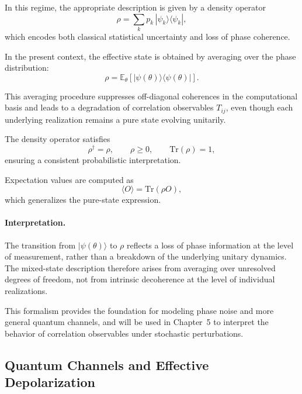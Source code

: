 \documentclass[a4paper]{article}
\begin{document}
\medskip

In this regime, the appropriate description is given by a density operator
\[
\rho = \sum_k p_k \, |\psi_k\rangle \langle \psi_k|,
\]
which encodes both classical statistical uncertainty and loss of phase coherence.

\medskip

In the present context, the effective state is obtained by averaging over the phase distribution:
\[
\rho = \mathbb{E}_{\theta}\!\left[ |\psi(\theta)\rangle \langle \psi(\theta)| \right].
\]

\medskip

This averaging procedure suppresses off-diagonal coherences in the computational basis and leads to a degradation of correlation observables \( T_{ij} \), even though each underlying realization remains a pure state evolving unitarily.

\medskip

The density operator satisfies
\[
\rho^\dagger = \rho,
\qquad
\rho \ge 0,
\qquad
\mathrm{Tr}(\rho) = 1,
\]
ensuring a consistent probabilistic interpretation.

\medskip

Expectation values are computed as
\[
\langle O \rangle = \mathrm{Tr}(\rho O),
\]
which generalizes the pure-state expression.

\medskip

\paragraph{Interpretation.}

The transition from \( |\psi(\theta)\rangle \) to \( \rho \) reflects a loss of phase information at the level of measurement, rather than a breakdown of the underlying unitary dynamics. The mixed-state description therefore arises from averaging over unresolved degrees of freedom, not from intrinsic decoherence at the level of individual realizations.

\medskip

This formalism provides the foundation for modeling phase noise and more general quantum channels, and will be used in Chapter~5 to interpret the behavior of correlation observables under stochastic perturbations.


\subsection{Quantum Channels and Effective Depolarization}
\end{document}

